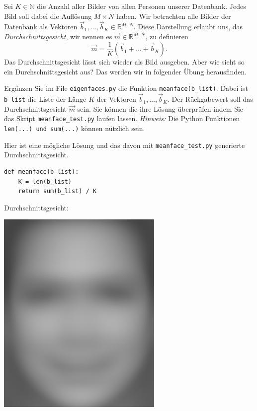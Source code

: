 Sei $K\in\mathbb N$ die Anzahl aller Bilder von allen Personen unserer Datenbank.
Jedes Bild soll dabei die Auflösung $M\times N$ haben.
Wir betrachten alle Bilder der Datenbank als Vektoren $\vec b_1,\ldots,\vec b_K\in\mathbb R^{M\cdot N}$.
Diese Darstellung erlaubt uns, das \textit{Durchschnittsgesicht}, wir nennen es $\vec m\in\mathbb R^{M\cdot N}$, zu definieren
\begin{equation*}
	\vec m=\frac{1}{K}\left(\vec b_1+\ldots+\vec b_K\right).
\end{equation*}
Das Durchschnittsgesicht lässt sich wieder als Bild ausgeben.
Aber wie sieht so ein Durchschnittsgesicht aus?
Das werden wir in folgender Übung herausfinden.
\begin{aufgabe}
	Ergänzen Sie im File \texttt{eigenfaces.py} die Funktion \texttt{meanface(b\_list)}.
	Dabei ist \texttt{b\_list} die Liste der Länge $K$ der Vektoren $\vec b_1,\ldots,\vec b_K$.
	Der Rückgabewert soll das Durchschnittsgesicht $\vec m$ sein.
	Sie können die ihre Lösung überprüfen indem Sie das Skript \texttt{meanface\_test.py} laufen lassen.
	\textit{Hinweis:} Die Python Funktionen \texttt{len(...) und sum(...)} können nützlich sein.
\end{aufgabe}
\begin{losung*}
	Hier ist eine mögliche Lösung und das davon mit \texttt{meanface\_test.py} generierte Durchschnittsgesicht.\\[0.5cm]
	\begin{minipage}{0.45\textwidth}
\begin{lstlisting}[style=python]
def meanface(b_list):
	K = len(b_list)
	return sum(b_list) / K
\end{lstlisting}
	\end{minipage}\hfill
	\begin{minipage}{0.3\textwidth}\vspace{-1cm}
		\centering\hfill Durchschnittsgesicht:
	\end{minipage}
	\begin{minipage}{0.2\textwidth}\vspace{-1cm}
		\centering\includegraphics[width=0.6\textwidth]{images/facespace/meanface}
	\end{minipage}
\end{losung*}
